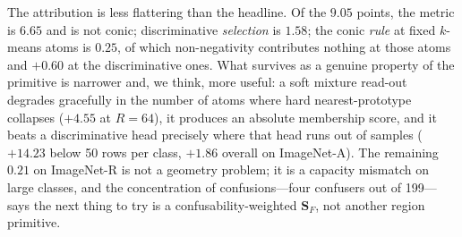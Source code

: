 \documentclass[10pt,twocolumn]{article}
\newcommand{\bS}{\mathbf{S}}
\begin{document}
The attribution is less flattering than the headline. Of the $9.05$ points, the
metric is $6.65$ and is not conic; discriminative \emph{selection} is $1.58$;
the conic \emph{rule} at fixed $k$-means atoms is $0.25$, of which
non-negativity contributes nothing at those atoms and $+0.60$ at the
discriminative ones. What survives as a genuine property of
the primitive is narrower and, we think, more useful: a soft mixture read-out
degrades gracefully in the number of atoms where hard nearest-prototype
collapses ($+4.55$ at $R{=}64$), it produces an absolute membership score, and
it beats a discriminative head precisely where that head runs out of samples
($+14.23$ below 50 rows per class, $+1.86$ overall on ImageNet-A). The remaining
$0.21$ on ImageNet-R is not a geometry problem; it is a capacity mismatch on
large classes, and the concentration of confusions---four confusers out of
199---says the next thing to try is a confusability-weighted $\bS_F$, not
another region primitive.
\end{document}
